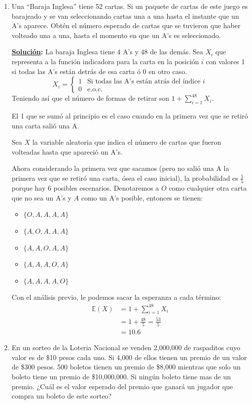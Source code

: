 \documentclass[11pt,letterpaper]{report}
\newcommand{\sol}{\textbf{\underline{Solución}: }} %
\begin{document}
\begin{enumerate}
\item Una ``Baraja Inglesa'' tiene 52 cartas. Si un paquete de cartas de este juego es barajeado y
se van seleccionando cartas una a una hasta el instante que un A's aparece. Obtén el número esperado
de cartas que se tuvieron que haber volteado una a una, hasta el momento en que un A's es seleccionado.

\sol La baraja Inglesa tiene 4 A's y 48 de las demás. Sea $X_i$ que representa a la función indicadora
para la carta en la posición $i$ con valores 1 si todas las A's están detrás de esa carta ó 0 en
otro caso.
\[
    X_i =
        \begin{cases}
            1 & \text{Si todas las A's están atrás del índice $i$}\\
            0 & \text{e.o.c.}
        \end{cases}
\]
Teniendo así que el número de formas de retirar son $1 + \sum_{i=1}^{48} X_i$.

El 1 que se sumó al principio es el caso cuando en la primera vez que se retiró una carta salió una A.

Sea $X$ la variable aleatoria que indica el número de cartas que fueron volteadas hasta que apareció un A's.

Ahora considerando la primera vez que sacamos (pero no salió una A la primera vez que se retiró una
carta, ósea el caso inicial), la probabilidad es $\frac{1}{5}$ porque hay 6 posibles
escenarios. Denotaremos a $O$ como cualquier otra carta que no sea un A's y $A$ como un A's posible,
entonces se tienen:
\begin{itemize}
    \item $\{ O,A,A,A,A \}$
    \item $\{ A,O,A,A,A \}$
    \item $\{ A,A,O,A,A \}$
    \item $\{ A,A,A,O,A \}$
    \item $\{ A,A,A,A,O \}$
\end{itemize}

Con el análisis previo, le podemos sacar la esperanza a cada término:
\begin{align*}
    \mathds{E}(X) 
        &= 1 + \sum_{i=1}^{48} X_i\\
        &= 1 + \frac{48}{5} = \frac{53}{5}\\
        &= 10.6
\end{align*}

\item En un sorteo de la Loteria Nacional se venden 2,000,000 de raspaditos cuyo valor es de \$10
pesos cada uno. Si 4,000 de ellos tienen un premio de un valor de \$300 pesos. 500 boletos tienen un
premio de \$8,000 mientras que solo un boleto tiene un premio de \$10,000,000. Si ningún boleto tiene
mas de un premio. ¿Cuál es el valor esperado del premio que ganará un jugador que compra un boleto
de este sorteo?


\end{enumerate}
\end{document}
